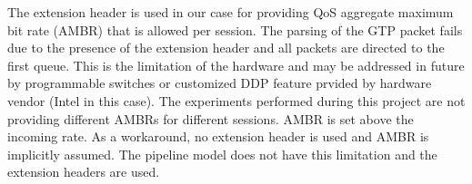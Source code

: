 The extension header is used in our case for  providing QoS aggregate maximum bit rate (AMBR) that is allowed per session. The parsing of the GTP packet fails due to the presence of the extension header and all packets are directed to the first queue.
This is the limitation of the hardware and may be addressed in future by programmable switches or customized DDP feature prvided by hardware vendor (Intel in this case).
The experiments performed during this project are not providing different AMBRs for different sessions. AMBR is set above the incoming rate. As a workaround, no extension header is used and AMBR is implicitly assumed. The pipeline model does not have this limitation and the extension headers are used.














